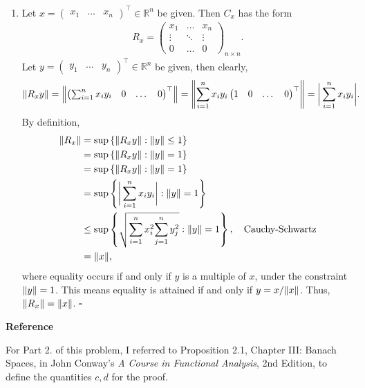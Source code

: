 \documentclass[11pt]{article}
\begin{document}
\begin{enumerate}
	
	\item  Let ${x} = \begin{pmatrix}
	x_1 & \dots & x_n
	\end{pmatrix}^\top \in \mathbb{R}^n$ be given. Then $C_x$ has the form
	\begin{align*}
	R_x = \begin{pmatrix}
	x_1 & \dots & x_n\\
	\vdots & \ddots  & \vdots\\
	 0 & \dots & 0
	\end{pmatrix}_{n\times n}.
	\end{align*} 
	Let ${y} = \begin{pmatrix}
	y_1 & \dots & y_n
	\end{pmatrix}^\top \in \mathbb{R}^n$ be given, then clearly,
	\begin{align*}
	\norm{ R_xy} &= \norm{ \begin{pmatrix}
	\sum^n_{i=1}x_iy_i & 0 & \dots & 0
	\end{pmatrix}^\top } =  \norm{ \sum^n_{i=1}x_iy_i \begin{pmatrix}
	1 & 0 & \dots & 0
	\end{pmatrix}^\top }= \bigg\vert \sum^n_{i=1}x_i y_i \bigg\vert.
	\end{align*}
	By definition, 
	\begin{align*}
	\norm{R_x} &= \sup \left\{\norm{R_x y} : \norm{y} \leq 1\right\}\nonumber\\
	&= \sup \left\{\norm{R_x y} : \norm{y}  = 1\right\}\nonumber\\
	&= \sup \left\{\norm{R_x y} : \norm{y}  = 1\right\}\nonumber\\
	&= \sup \left\{ \bigg\vert \sum^n_{i=1}x_i y_i \bigg\vert : \norm{y}  = 1\right\}\nonumber\\
	&\leq \sup \left\{ \sqrt{\sum^n_{i=1}x_i^2 {\sum^n_{j=1}y_j^2}} : \norm{y}  = 1\right\},\quad \text{Cauchy-Schwartz}\nonumber\\
	&= \norm{x} ,
	\end{align*}
	where equality occurs if and only if $y$ is a multiple of $x$, under the constraint $\norm{y}  = 1$. This means equality is attained if and only if $y = x/\norm{x} $. Thus, $\norm{R_x}  = \norm{x} $. \hfill $\square$
\end{enumerate}




\noindent \textbf{Reference}



For Part 2. of this problem, I referred to Proposition 2.1, Chapter III: Banach Spaces, in John Conway's \textit{A Course in Functional Analysis}, 2nd Edition, to define the quantities $c,d$ for the proof. 
\end{document}
